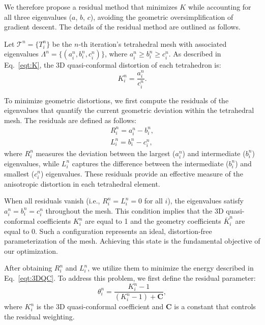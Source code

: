 \documentclass{article}
\begin{document}

We therefore propose a residual method that minimizes $K$ while accounting for all three eigenvalues ($a$, $b$, $c$), avoiding the geometric oversimplification of gradient descent. The details of the residual method are outlined as follows.  


Let $\mathcal{T}^n = \{T^n_i\}$ be the $n$-th iteration's tetrahedral mesh with associated eigenvalues $\Lambda^n = \{(a^n_i, b^n_i, c^n_i)\}$, where $a^n_i \geq b^n_i \geq c^n_i$. As described in Eq.~\eqref{eqt:K}, the 3D quasi-conformal distortion of each tetrahedron is:
\begin{equation}
    K^n_i = \frac{a^n_i}{c^n_i}.
\end{equation}

To minimize geometric distortions, we first compute the residuals of the eigenvalues that quantify the current geometric deviation within the tetrahedral mesh. The residuals are defined as follows:
\begin{align}\label{eqt:residual}
    R^n_i = a^n_i - b^n_i, \\
    L^n_i = b^n_i - c^n_i,
\end{align}
where $R^n_i$ measures the deviation between the largest ($a^n_i$) and intermediate ($b^n_i$) eigenvalues, while $L^n_i$ captures the difference between the intermediate ($b^n_i$) and smallest ($c^n_i$) eigenvalues. These residuals provide an effective measure of the anisotropic distortion in each tetrahedral element.


When all residuals vanish (i.e., $R^n_i = L^n_i = 0$ for all $i$), the eigenvalues satisfy $a^n_i = b^n_i = c^n_i$ throughout the mesh. This condition implies that the 3D quasi-conformal coefficients $K^n_i$ are equal to 1 and the geometry coefficients $\overline{K}^n_i$ are equal to 0. Such a configuration represents an ideal, distortion-free parameterization of the mesh. Achieving this state is the fundamental objective of our optimization.

After obtaining $R^n_i$ and $L^n_i$, we utilize them to minimize the energy described in Eq.~\eqref{eqt:3DQC}. To address this problem, we first define the residual parameter:
\begin{equation}\label{eqt:res_para}
    \theta^n_i = \frac{K^n_i - 1}{ (K^n_i - 1) +\mathbf{C}}, 
\end{equation}
where $K^n_i$ is the 3D quasi-conformal coefficient and $\mathbf{C}$ is a constant that controls the residual weighting. 
\end{document}
